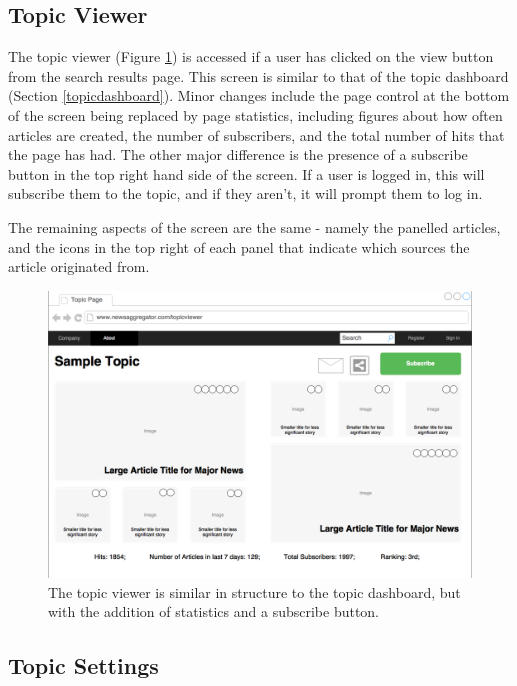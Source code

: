 \documentclass[12pt]{article}
\begin{document}
\begin{appendices}
\subsection{Topic Viewer}

The topic viewer (Figure \ref{topicViewer}) is accessed if a user has clicked on the view button from the search results page. This screen is similar to that of the topic dashboard (Section \ref{topicdashboard}). Minor changes include the page control at the bottom of the screen being replaced by page statistics, including figures about how often articles are created, the number of subscribers, and the total number of hits that the page has had. The other major difference is the presence of a subscribe button in the top right hand side of the screen. If a user is logged in, this will subscribe them to the topic, and if they aren't, it will prompt them to log in.

The remaining aspects of the screen are the same - namely the panelled articles, and the icons in the top right of each panel that indicate which sources the article originated from.

\label{topicviewer}

\begin{figure}[ht!]
  \centering
    \includegraphics[scale=0.3]{TopicViewer.png}
   \caption[A wireframe of the Topic Viewer]{The topic viewer is similar in structure to the topic dashboard, but with the addition of statistics and a subscribe button.}
   \label{topicViewer}
\end{figure}

\subsection{Topic Settings}


\end{appendices}
\end{document}
